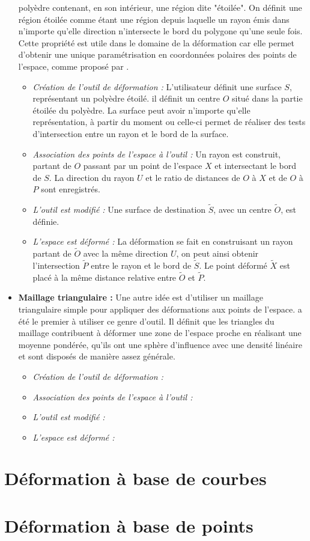 \begin{itemize}
  polyèdre contenant, en son intérieur, une région dite "étoilée". On
  définit une région étoilée comme étant une région depuis laquelle un
  rayon émis dans n'importe qu'elle direction n'intersecte le bord du
  polygone qu'une seule fois. Cette propriété est utile dans le
  domaine de la déformation car elle permet d'obtenir une unique
  paramétrisation en coordonnées polaires des points de l'espace,
  comme proposé par \cite{JL00}.
  \begin{itemize}
  \item{\textit{Création de l'outil de déformation :}} L'utilisateur
    définit une surface \( S \), représentant un polyèdre étoilé. il
    définit un centre \( O \) situé dans la partie étoilée du
    polyèdre. La surface peut avoir n'importe qu'elle représentation,
    à partir du moment ou celle-ci permet de réaliser des tests
    d'intersection entre un rayon et le bord de la surface.
  \item{\textit{Association des points de l'espace à l'outil :}} Un
    rayon est construit, partant de \( O \) passant par un point de
    l'espace \( X \) et intersectant le bord de \( S \). La direction
    du rayon \( U \) et le ratio de distances de \( O \) à \( X \) et
    de \( O \) à \( P \) sont enregistrés.
  \item{\textit{L'outil est modifié :}} Une surface de destination \(
    \tilde{S} \), avec un centre \( \tilde{O} \), est définie.
  \item{\textit{L'espace est déformé :}} La déformation se fait en
    construisant un rayon partant de \( \tilde{O} \) avec la même
    direction \( U \), on peut ainsi obtenir l'intersection \(
    \tilde{P} \) entre le rayon et le bord de \( \tilde{S} \). Le
    point déformé \( \tilde{X} \) est placé à la même distance
    relative entre \( \tilde{O} \) et \( \tilde{P} \).
  \end{itemize}
\item{\textbf{Maillage triangulaire :}} Une autre idée est d'utiliser
  un maillage triangulaire simple pour appliquer des déformations aux
  points de l'espace. \cite{KO03} a été le premier à utiliser ce genre
  d'outil. Il définit que les triangles du maillage contribuent à
  déformer une zone de l'espace proche en réalisant une moyenne
  pondérée, qu'ils ont une sphère d'influence avec une densité
  linéaire et sont disposés de manière assez générale.
  \begin{itemize}
  \item{\textit{Création de l'outil de déformation :}}
  \item{\textit{Association des points de l'espace à l'outil :}}
  \item{\textit{L'outil est modifié :}}
  \item{\textit{L'espace est déformé :}}
  \end{itemize}
\end{itemize}

\section{Déformation à base de courbes}

\section{Déformation à base de points}


